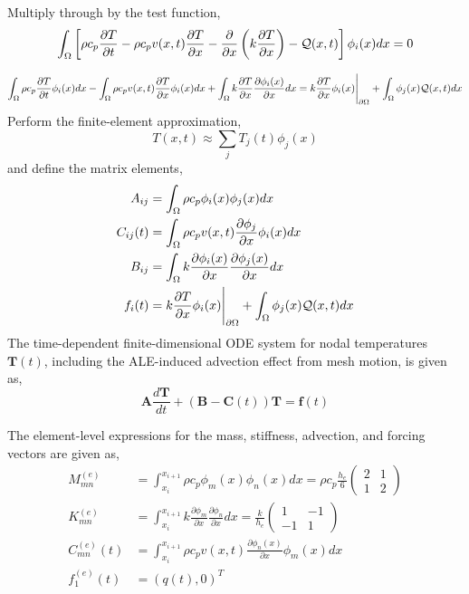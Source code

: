 Multiply through by the test function,
\begin{equation}
    \int_{\Omega}\left[\rho c_p\frac{\partial T}{\partial t} - \rho c_p v(x,t)\frac{\partial T}{\partial x} - \frac{\partial}{\partial x}\left(k\frac{\partial T}{\partial x}\right) - \mathcal{Q}(x,t)\right]\phi_i(x)dx = 0
\end{equation}

\begin{equation}
    \int_{\Omega}\rho c_p\frac{\partial T}{\partial t}\phi_i(x)dx - \int_{\Omega}\rho c_p v(x,t)\frac{\partial T}{\partial x}\phi_i(x)dx + \int_{\Omega} k\frac{\partial T}{\partial x}\frac{\partial\phi_i(x)}{\partial x} dx = k\frac{\partial T}{\partial x}\phi_i(x)\Bigg|_{\partial\Omega} + \int_{\Omega}\phi_j(x)\mathcal{Q}(x,t)dx
\end{equation}
Perform the finite-element approximation,
\begin{equation}
    T(x,t)\approx\sum_jT_j(t)\phi_j(x)
\end{equation}
and define the matrix elements,
\begin{align}
    A_{ij} &= \int_{\Omega}\rho c_p\phi_i(x)\phi_j(x)dx\\
    C_{ij}(t) &= \int_{\Omega}\rho c_p v(x,t) \frac{\partial\phi_j}{\partial x}\phi_i(x)dx\\
    B_{ij} &= \int_{\Omega}k\frac{\partial\phi_i(x)}{\partial x}\frac{\partial\phi_j(x)}{\partial x}dx\\
    f_i(t) &= k\frac{\partial T}{\partial x}\phi_i(x)\Bigg|_{\partial\Omega} + \int_{\Omega}\phi_j(x)\mathcal{Q}(x,t)dx
\end{align}
The time-dependent finite-dimensional ODE system for nodal temperatures $\mathbf{T}(t)$, including the ALE-induced advection effect from mesh motion, is given as,
\begin{equation}
    \mathbf{A}\frac{d\mathbf{T}}{dt} + \left(\mathbf{B} - \mathbf{C}(t)\right)\mathbf{T} = \mathbf{f}(t)
\end{equation}

The element-level expressions for the mass, stiffness, advection, and forcing vectors are given as,
\begin{align}
    M^{(e)}_{mn} &= \int_{x_i}^{x_{i+1}}\rho c_p\phi_m(x)\phi_n(x)dx = \rho c_p \frac{h_e}{6}\begin{pmatrix}
        2 & 1 \\ 1 & 2
    \end{pmatrix}\\
    K^{(e)}_{mn} &= \int_{x_i}^{x_{i+1}} k \frac{\partial \phi_m}{\partial x}\frac{\partial \phi_n}{\partial x} dx = \frac{k}{h_e}\begin{pmatrix}
        1 & -1 \\ -1 & 1
    \end{pmatrix}\\
    C^{(e)}_{mn}(t) &= \int_{x_i}^{x_{i+1}}\rho c_p v(x,t) \frac{\partial \phi_n(x)}{\partial x}\phi_m(x) dx\\
    f^{(e)}_1(t) &= \left(q(t),0\right)^T
\end{align}

